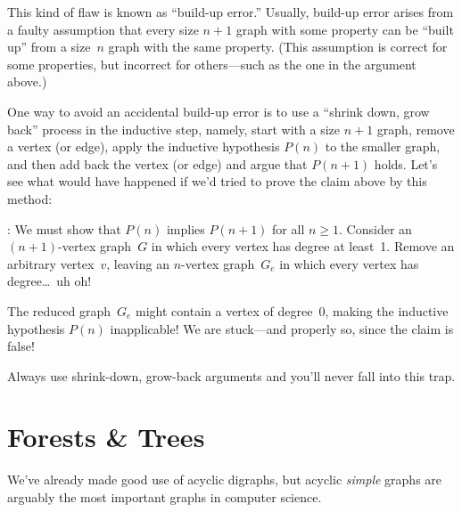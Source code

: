 This kind of flaw is known as ``build-up error.''  Usually, build-up
error arises from a faulty assumption that every size $n + 1$ graph
with some property can be ``built up'' from a size~$n$ graph with the
same property.  (This assumption is correct for some properties, but
incorrect for others---such as the one in the argument above.)

One way to avoid an accidental build-up error is to use a ``shrink
down, grow back'' process in the inductive step, namely, start with a
size $n+1$ graph, remove a vertex (or edge), apply the inductive
hypothesis $P(n)$ to the smaller graph, and then add back the vertex
(or edge) and argue that $P(n + 1)$ holds.  Let's see what would have
happened if we'd tried to prove the claim above by this method:

: We must show that $P(n)$
implies $P(n + 1)$ for all $n \ge 1$.  Consider an $(n + 1)$-vertex
graph~$G$ in which every vertex has degree at least~1.  Remove an
arbitrary vertex~$v$, leaving an $n$-vertex graph~$G_e$ in which every
vertex has degree\dots\ uh oh!

The reduced graph~$G_e$ might contain a vertex of degree~0, making the
inductive hypothesis $P(n)$ inapplicable!  We are stuck---and
properly so, since the claim is false!

Always use shrink-down, grow-back arguments and you'll never fall into
this trap.


\fi

\begin{problems}
\classproblems
{}

\homeworkproblems
{}

\examproblems
{}
\end{problems}

\section{Forests \& Trees}\label{trees-sec}

We've already made good use of acyclic digraphs, but acyclic
\emph{simple} graphs are arguably the most important graphs in
computer science.

